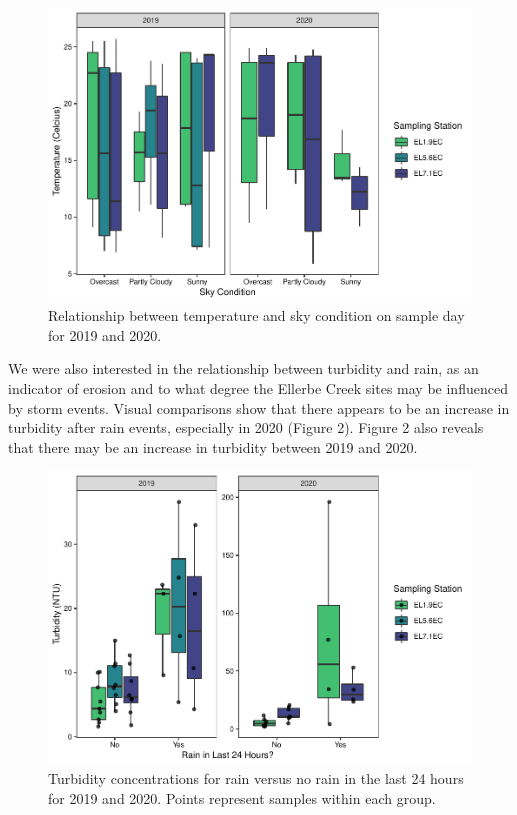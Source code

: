 \documentclass[
  12pt,
]{article}
\begin{document}
\begin{figure}
\centering
\includegraphics{August_Lindborg_ENV872_Project_files/figure-latex/unnamed-chunk-13-1.pdf}
\caption{Relationship between temperature and sky condition on sample
day for 2019 and 2020.}
\end{figure}

\newpage

We were also interested in the relationship between turbidity and rain,
as an indicator of erosion and to what degree the Ellerbe Creek sites
may be influenced by storm events. Visual comparisons show that there
appears to be an increase in turbidity after rain events, especially in
2020 (Figure 2). Figure 2 also reveals that there may be an increase in
turbidity between 2019 and 2020.

\begin{figure}
\centering
\includegraphics{August_Lindborg_ENV872_Project_files/figure-latex/unnamed-chunk-14-1.pdf}
\caption{Turbidity concentrations for rain versus no rain in the last 24
hours for 2019 and 2020. Points represent samples within each group.}
\end{figure}
\end{document}
